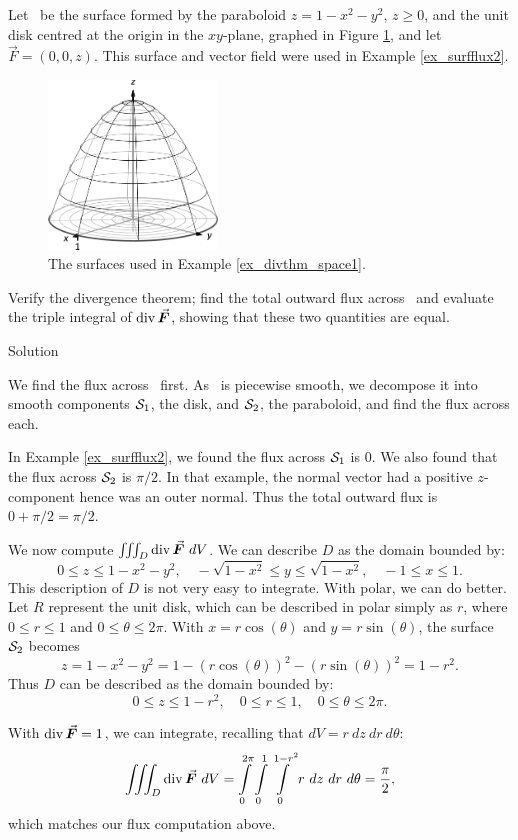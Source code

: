 \begin{example}
\label{ex_divthm_space1}
Let \surfaceS\ be the surface formed by the paraboloid $z=1-x^2-y^2$, $z\geq 0$, and the unit disk centred at the origin in the $xy$-plane, graphed in Figure \ref{fig_Vector_Calc_30}, and let $\vec F = \left( 0,0,z\right)$. This surface and vector field were used in Example \ref{ex_surfflux2}.

\begin{figure}[H]
	\begin{center}
			\includegraphics[width=0.4\textwidth]{fig_Vector_Calc_30}
	\caption{The surfaces used in  Example \ref{ex_divthm_space1}.}
	\label{fig_Vector_Calc_30}
	\end{center}
\end{figure}




Verify the divergence theorem; find the total outward flux across \surfaceS\ and evaluate the triple integral of $\divv \vec F$, showing that these two quantities are equal.

Solution 

We find the flux across \surfaceS\ first. As \surfaceS\ is piecewise smooth, we decompose it into smooth components $\mathcal{S}_1$, the disk, and $\mathcal{S}_2$, the paraboloid, and find the flux across each.

In Example \ref{ex_surfflux2}, we found the flux across $\mathcal{S}_1$ is 0. We also found that the flux across $\mathcal{S}_2$ is $\pi/2$. In that example, the normal vector had a positive $z$-component hence was an outer normal. Thus the total outward flux is $0+\pi/2 = \pi/2$.

We now compute $\iiint_D \divv \vec F\ dV$. We can describe $D$ as the domain bounded by:
$$0\leq z\leq 1-x^2-y^2, \quad -\sqrt{1-x^2}\leq y\leq \sqrt{1-x^2},\quad -1\leq x\leq 1.$$
This description of $D$ is not very easy to integrate. With polar, we can do better. Let $R$ represent the unit disk, which can be described in polar simply as $r$, where $0\leq r\leq 1$ and $0\leq \theta\leq 2\pi$. With $x=r\cos (\theta)$ and $y=r\sin(\theta)$, the surface $\mathcal{S}_2$ becomes
$$z=1-x^2-y^2 = 1-\left(r\cos(\theta)\right)^2-\left(r\sin(\theta)\right)^2= 1-r^2.$$ 
Thus $D$ can be described as the domain bounded by:
$$0\leq z\leq 1-r^2,\quad 0\leq r\leq 1,\quad 0\leq \theta\leq 2\pi.$$

With $\divv \vec F = 1$, we can integrate, recalling that $dV = r\ dz\ dr\ d\theta$:
$$\iiint_D\divv \vec F\ dV = \int\limits_0^{2\pi}\int\limits_0^1\int\limits_0^{1-r^2} r\ dz\ dr\ d\theta = \frac{\pi}2,$$
which matches our flux computation above.
\end{example}

